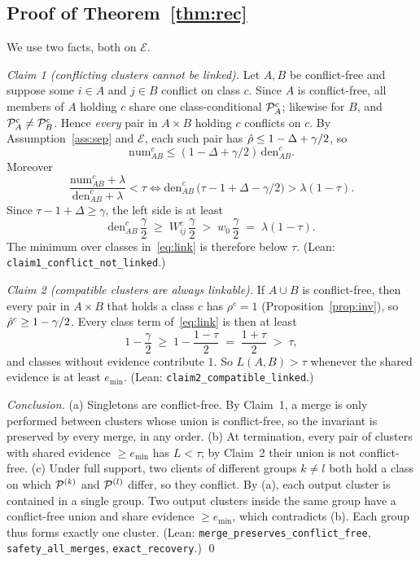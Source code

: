 \subsection{Proof of Theorem~\ref{thm:rec}}
We use two facts, both on $\mathcal E$.

\emph{Claim 1 (conflicting clusters cannot be linked).} Let $A,B$ be conflict-free and suppose some $i\in A$ and $j\in B$ conflict on class $c$. Since $A$ is conflict-free, all members of $A$ holding $c$ share one class-conditional $\mathcal{P}_A^c$; likewise for $B$, and $\mathcal{P}_A^c\neq\mathcal{P}_B^c$. Hence \emph{every} pair in $A\times B$ holding $c$ conflicts on $c$. By Assumption~\ref{ass:sep} and $\mathcal E$, each such pair has $\hat\rho\le1-\Delta+\gamma/2$, so
\[
\mathrm{num}^c_{AB}\le(1-\Delta+\gamma/2)\,\mathrm{den}^c_{AB}.
\]
Moreover
\[
\frac{\mathrm{num}^c_{AB}+\lambda}{\mathrm{den}^c_{AB}+\lambda}<\tau
\iff
\mathrm{den}^c_{AB}\,\big(\tau-1+\Delta-\gamma/2\big)>\lambda(1-\tau).
\]
Since $\tau-1+\Delta\ge\gamma$, the left side is at least
\[
\mathrm{den}^c_{AB}\,\frac{\gamma}{2}\;\ge\;W_{ij}^c\,\frac{\gamma}{2}\;>\;w_0\,\frac{\gamma}{2}\;=\;\lambda(1-\tau).
\]
The minimum over classes in~\eqref{eq:link} is therefore below $\tau$. (Lean: \texttt{claim1\_conflict\_not\_linked}.)

\emph{Claim 2 (compatible clusters are always linkable).} If $A\cup B$ is conflict-free, then every pair in $A\times B$ that holds a class $c$ has $\rho^c=1$ (Proposition~\ref{prop:inv}), so $\hat\rho^c\ge1-\gamma/2$. Every class term of~\eqref{eq:link} is then at least
\[
1-\frac{\gamma}{2}\;\ge\;1-\frac{1-\tau}{2}\;=\;\frac{1+\tau}{2}\;>\;\tau,
\]
and classes without evidence contribute $1$. So $L(A,B)>\tau$ whenever the shared evidence is at least $e_{\min}$. (Lean: \texttt{claim2\_compatible\_linked}.)

\emph{Conclusion.} (a) Singletons are conflict-free. By Claim~1, a merge is only performed between clusters whose union is conflict-free, so the invariant is preserved by every merge, in any order. (b) At termination, every pair of clusters with shared evidence $\ge e_{\min}$ has $L<\tau$; by Claim~2 their union is not conflict-free. (c) Under full support, two clients of different groups $k\ne l$ both hold a class on which $\mathcal{P}^{(k)}$ and $\mathcal{P}^{(l)}$ differ, so they conflict. By (a), each output cluster is contained in a single group. Two output clusters inside the same group have a conflict-free union and share evidence $\ge e_{\min}$, which contradicts (b). Each group thus forms exactly one cluster. (Lean: \texttt{merge\_preserves\_conflict\_free}, \texttt{safety\_all\_merges}, \texttt{exact\_recovery}.) \qed

